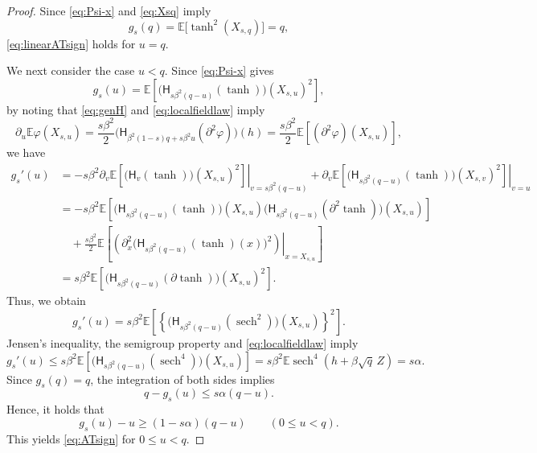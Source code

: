 \documentclass[11pt]{article}
\numberwithin{equation}{section}
\newcommand{\E}{\mathbb{E}}
\newcommand{\1}{\mathbf 1}
\newcommand{\sech}{\operatorname{sech}}
\begin{document}
\begin{proof}
Since \eqref{eq:Psi-x} and \eqref{eq:Xsq} imply
\[
g_s(q) = \E\bigl[ \tanh ^2 (X_{s,q}) \bigr] =q ,
\]
\eqref{eq:linearATsign} holds for $u=q$.

We next consider the case $u<q$. 
Since \eqref{eq:Psi-x} gives
\[
g_s(u) = \E\left[ \bigl(\mathsf H_{s\beta^2(q-u)} (\tanh )\bigr)(X_{s,u}) ^2 \right] ,
\]
by noting that \eqref{eq:genH} and \eqref{eq:localfieldlaw} imply
\[
\partial _u \E\varphi(X_{s,u}) = \frac{s\beta ^2}{2} \bigl(\mathsf H_{\beta^2(1-s)q+s\beta^2u} (\partial ^2 \varphi ) \bigr) (h) = \frac{s\beta ^2}{2} \E\left[ (\partial ^2 \varphi ) (X_{s,u}) \right] ,
\]
we have
\begin{align*}
g_s'(u) &= -s\beta^2 \left. \partial _v \E\left[ \bigl(\mathsf H_v (\tanh )\bigr)(X_{s,u}) ^2 \right] \right| _{v=s\beta^2(q-u)} + \left. \partial _v \E\left[ \bigl(\mathsf H_{s\beta^2(q-u)} (\tanh )\bigr)(X_{s,v}) ^2 \right] \right| _{v=u} \\
%
&= - s\beta^2 \E\left[ \bigl(\mathsf H_{s\beta^2(q-u)} (\tanh )\bigr)(X_{s,u}) \bigl(\mathsf H_{s\beta^2(q-u)} ( \partial ^2 \tanh )\bigr)(X_{s,u}) \right] \\
&\quad + \frac{s\beta ^2}{2} \E\left[ \left. \left( \partial _x ^2 \bigl(\mathsf H_{s\beta^2(q-u)} (\tanh ) (x)\bigr) ^2 \right) \right| _{x=X_{s,u}} \right] \\
%
&= s\beta ^2 \E\left[ \bigl(\mathsf H_{s\beta^2(q-u)} (\partial \tanh )\bigr) (X_{s,u}) ^2 \right] .
\end{align*}
Thus, we obtain
\[
 g_s'(u)
 =s\beta^2\E\left[
   \left\{
    \bigl(\mathsf H_{s\beta^2(q-u)}
      ( \sech^2 )\bigr)(X_{s,u})
   \right\}^2
 \right].
\]
Jensen's inequality, the semigroup property and \eqref{eq:localfieldlaw} imply
\[
 g_s'(u)
 \le s\beta^2\E\left[
   \bigl(\mathsf H_{s\beta^2(q-u)}
     ( \sech^4 )\bigr)(X_{s,u})
 \right]
 =s\beta^2\mathbb{E}\sech^4(h+\beta\sqrt q\,Z)
 =s\alpha.
\]
Since $g_s(q)=q$, the integration of both sides implies
\[
q - g_s(u) \leq s \alpha (q-u) .
\]
Hence, it holds that
\begin{equation}
 g_s(u)-u\ge(1-s\alpha)(q-u)
 \qquad(0\le u<q).
 \label{eq:leftstrict}
\end{equation}
This yields \eqref{eq:ATsign} for $0\le u<q$.


\end{proof}
\end{document}

